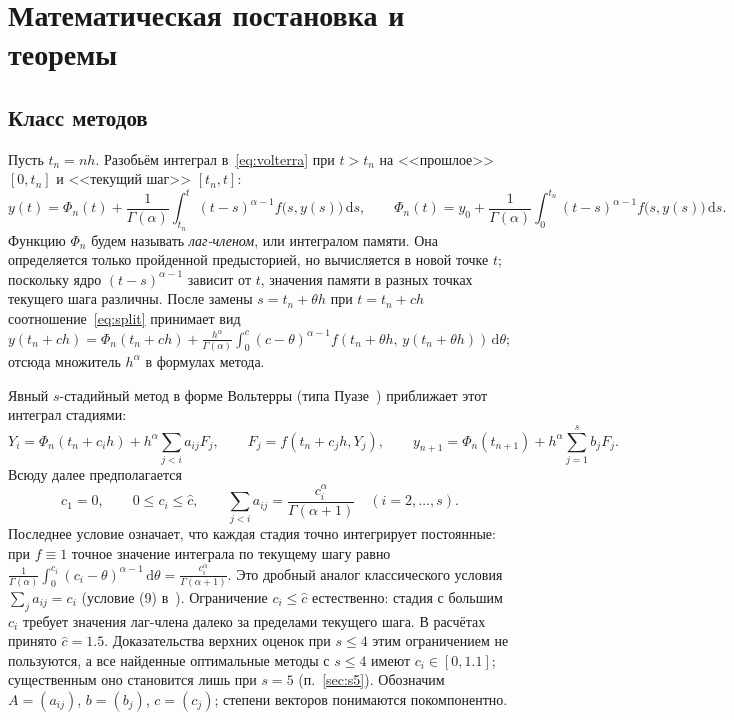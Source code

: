 \documentclass[11pt,a4paper]{article}
\theoremstyle{plain}
\theoremstyle{definition}
\newcommand{\G}{\Gamma}
\newcommand{\dd}{\,\mathrm{d}}
\begin{document}
\section{Математическая постановка и теоремы}

\subsection{Класс методов}

Пусть $t_n=nh$. Разобьём интеграл в~\eqref{eq:volterra} при $t>t_n$ на <<прошлое>> $[0,t_n]$ и <<текущий шаг>> $[t_n,t]$:
\begin{equation}\label{eq:split}
y(t)=\Phi_n(t)+\frac{1}{\G(\alpha)}\int_{t_n}^{t}(t-s)^{\alpha-1}f\bigl(s,y(s)\bigr)\dd s,\qquad
\Phi_n(t)=y_0+\frac{1}{\G(\alpha)}\int_0^{t_n}(t-s)^{\alpha-1}f\bigl(s,y(s)\bigr)\dd s .
\end{equation}
Функцию $\Phi_n$ будем называть \emph{лаг-членом}, или интегралом памяти. Она определяется только пройденной предысторией, но вычисляется в новой точке $t$; поскольку ядро $(t-s)^{\alpha-1}$ зависит от $t$, значения памяти в разных точках текущего шага различны. После замены $s=t_n+\theta h$ при $t=t_n+ch$ соотношение~\eqref{eq:split} принимает вид $y(t_n+ch)=\Phi_n(t_n+ch)+\frac{h^{\alpha}}{\G(\alpha)}\int_0^{c}(c-\theta)^{\alpha-1}f(t_n+\theta h,\,y(t_n+\theta h))\dd\theta$; отсюда множитель $h^{\alpha}$ в формулах метода.

Явный $s$-стадийный метод в форме Вольтерры (типа Пуазе~\cite{Pouzet1960}) приближает этот интеграл стадиями:
\begin{equation}\label{eq:method}
Y_i=\Phi_n(t_n+c_ih)+h^{\alpha}\sum_{j<i}a_{ij}F_j,\qquad F_j=f(t_n+c_jh,Y_j),\qquad
y_{n+1}=\Phi_n(t_{n+1})+h^{\alpha}\sum_{j=1}^{s}b_jF_j .
\end{equation}
Всюду далее предполагается
\begin{equation}\label{eq:rowsum}
c_1=0,\qquad 0\le c_i\le\hat c,\qquad \sum_{j<i}a_{ij}=\frac{c_i^{\alpha}}{\G(\alpha+1)}\quad(i=2,\dots,s).
\end{equation}
Последнее условие означает, что каждая стадия точно интегрирует постоянные: при $f\equiv1$ точное значение интеграла по текущему шагу равно $\frac{1}{\G(\alpha)}\int_0^{c_i}(c_i-\theta)^{\alpha-1}\dd\theta=\frac{c_i^{\alpha}}{\G(\alpha+1)}$. Это дробный аналог классического условия $\sum_j a_{ij}=c_i$ (условие (9) в~\cite{Lubich1983}). Ограничение $c_i\le\hat c$ естественно: стадия с большим $c_i$ требует значения лаг-члена далеко за пределами текущего шага. В расчётах принято $\hat c=1.5$. Доказательства верхних оценок при $s\le4$ этим ограничением не пользуются, а все найденные оптимальные методы с $s\le4$ имеют $c_i\in[0,1.1]$; существенным оно становится лишь при $s=5$ (п.~\ref{sec:s5}). Обозначим $A=(a_{ij})$, $b=(b_j)$, $c=(c_j)$; степени векторов понимаются покомпонентно.
\end{document}
